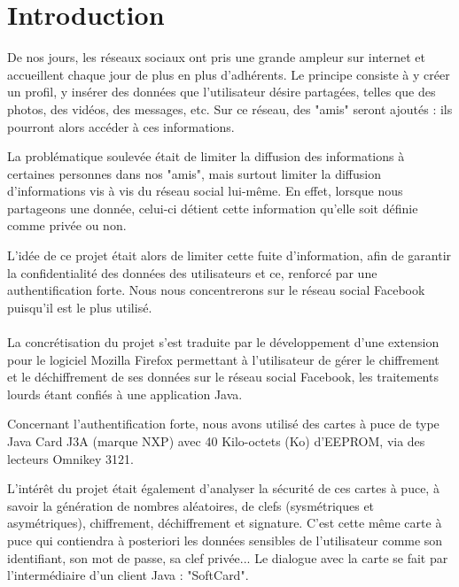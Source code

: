 \documentclass[a4paper,11pt,french]{article}
\begin{document}
\makeFirstPage
\clearpage


\section{Introduction}
\renewcommand\labelitemi{\textbullet} %
\renewcommand\labelitemii{$\circ$} %
De nos jours, les réseaux sociaux ont pris une grande ampleur sur internet
et accueillent chaque jour de plus en plus d'adhérents. Le principe consiste à 
y créer un profil, y insérer des données que l'utilisateur désire partagées, 
telles que des photos, des vidéos, des messages, etc. Sur ce réseau, des "amis"
seront ajoutés : ils pourront alors accéder à ces informations.

La problématique soulevée était de limiter la diffusion des informations à 
certaines personnes dans nos "amis", mais surtout limiter la diffusion 
d'informations vis à vis du réseau social lui-même. En effet, lorsque nous 
partageons une donnée, celui-ci détient cette information qu'elle soit définie
comme privée ou non.

L'idée de ce projet était alors de limiter cette fuite d'information, afin de 
garantir la confidentialité des données des utilisateurs et ce, renforcé par une
authentification forte. Nous nous concentrerons sur le réseau social Facebook 
puisqu'il est le plus utilisé.


\paragraph{}
La concrétisation du projet s'est traduite par le développement d'une extension 
pour le logiciel Mozilla Firefox permettant à l’utilisateur de gérer le 
chiffrement et le déchiffrement de ses données sur le réseau social Facebook, 
les traitements lourds étant confiés à une application Java.

Concernant l’authentification forte, nous avons utilisé des cartes à puce de 
type Java Card J3A (marque NXP) avec 40 Kilo-octets (Ko) d'EEPROM, via des 
lecteurs Omnikey 3121. 

L'intérêt du projet était également d'analyser la sécurité de ces cartes à puce,
à savoir la génération de nombres aléatoires, de clefs (sysmétriques et 
asymétriques), chiffrement, déchiffrement et signature. C'est cette même carte
à puce qui contiendra à posteriori les données sensibles de l’utilisateur 
comme son identifiant, son mot de passe, sa clef privée... Le dialogue avec 
la carte se fait par l’intermédiaire d’un client Java : "SoftCard". 
\end{document}
